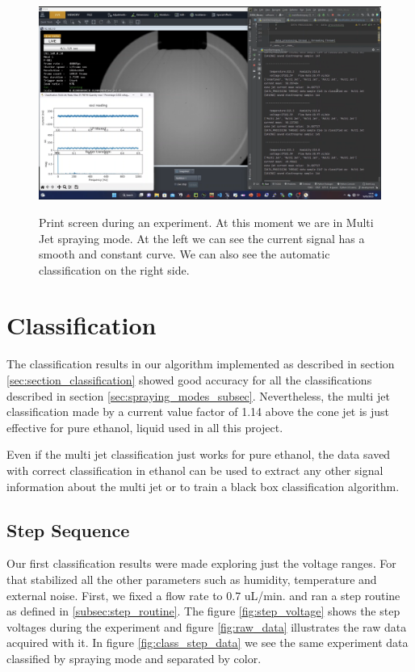 \begin{figure}[H]
    \center
    {\includegraphics[width=16cm]{Figuras/19:03/axs2.png}}
    \caption{Print screen during an experiment. At this moment we are in Multi Jet spraying mode. At the left we can see the current signal has a smooth and constant curve. We can also see the automatic classification on the right side.}
    \label{fig:multi_class_exp}
\end{figure}


\section{Classification}
\label{sec:classification_results}

The classification results in our algorithm implemented as described in section \ref{sec:section_classification} showed good accuracy for all the classifications described in section \ref{sec:spraying_modes_subsec}.
Nevertheless, the multi jet classification made by a current value factor of 1.14 above the cone jet is just effective for pure ethanol, liquid used in all this project.

Even if the multi jet classification just works for pure ethanol, the data saved with correct classification in ethanol can be used to extract any other signal information about the multi jet or to train a black box classification algorithm.

\subsection{Step Sequence}
\label{subsec:step_results}

Our first classification results were made exploring just the voltage ranges. For that stabilized all the other parameters such as humidity, temperature and external noise.
First, we fixed a flow rate to 0.7 uL/min. and ran a step routine as defined in \ref{subsec:step_routine}. 
The figure \ref{fig:step_voltage} shows the step voltages during the experiment and figure \ref{fig:raw_data} illustrates the raw data acquired with it. 
In figure \ref{fig:class_step_data} we see the same experiment data classified by spraying mode and separated by color.



